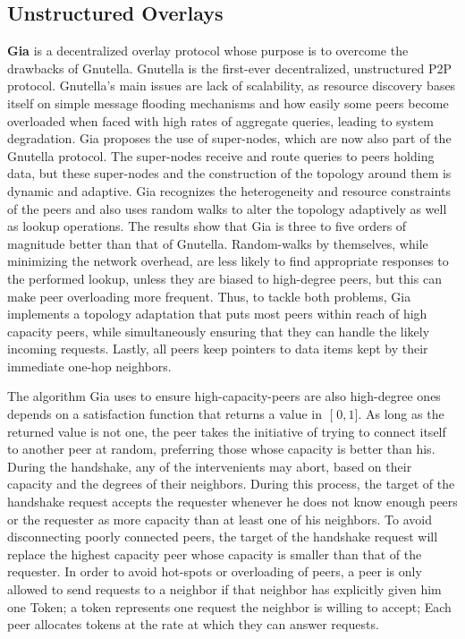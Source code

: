 \documentclass[runningheads]{llncs}
\begin{document}
\subsection{Unstructured Overlays}
\textbf{Gia} \cite{gia} is a decentralized overlay protocol whose purpose is to overcome the drawbacks of Gnutella\cite{gnutella-rfc, gnutella-cs}. Gnutella is the first-ever decentralized, unstructured P2P protocol. Gnutella's main issues are lack of scalability, as resource discovery bases itself on simple message flooding mechanisms and how easily some peers become overloaded when faced with high rates of aggregate queries, leading to system degradation. Gia proposes the use of super-nodes, which are now also part of the Gnutella protocol. The super-nodes receive and route queries to peers holding data, but these super-nodes and the construction of the topology around them is dynamic and adaptive. Gia recognizes the heterogeneity and resource constraints of the peers and also uses random walks to alter the topology adaptively as well as lookup operations. The results show that Gia is three to five orders of magnitude better than that of Gnutella. Random-walks by themselves, while minimizing the network overhead, are less likely to find appropriate responses to the performed lookup, unless they are biased to high-degree peers, but this can make peer overloading more frequent. Thus, to tackle both problems, Gia implements a topology adaptation that puts most peers within reach of high capacity peers, while simultaneously ensuring that they can handle the likely incoming requests. Lastly, all peers keep pointers to data items kept by their immediate one-hop neighbors.

The algorithm Gia uses to ensure high-capacity-peers are also high-degree ones depends on a satisfaction function that returns a value in $\mathclose[0,1\mathclose]$. As long as the returned value is not one, the peer takes the initiative of trying to connect itself to another peer at random, preferring those whose capacity is better than his. During the handshake, any of the intervenients may abort, based on their capacity and the degrees of their neighbors. During this process, the target of the handshake request accepts the requester whenever he does not know enough peers or the requester as more capacity than at least one of his neighbors. To avoid disconnecting poorly connected peers, the target of the handshake request will replace the highest capacity peer whose capacity is smaller than that of the requester. In order to avoid hot-spots or overloading of peers, a peer is only allowed to send requests to a neighbor if that neighbor has explicitly given him one Token; a token represents one request the neighbor is willing to accept; Each peer allocates tokens at the rate at which they can answer requests.
\end{document}
